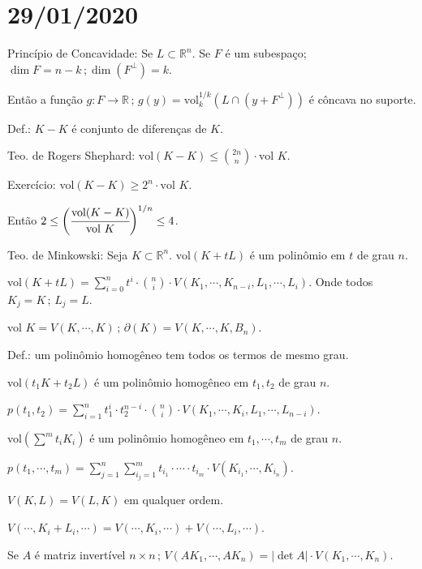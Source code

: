 \documentclass[12pt]{article}
\begin{document}
\vspace{100mm}

\section{29/01/2020}

\begin{flushright}
\end{flushright}

Princ\'ipio de Concavidade: Se $L \subset \mathbb{R}^n$. Se $F$ \'e um subespa\c{c}o; $\dim F = n - k\,;\dim (F^\perp) = k$.

Ent\~ao a fun\c{c}\~ao $g: F \to \mathbb{R}\,;\,g(y) = \text{vol}_k^{1/k} (L \cap (y + F^\perp))$ \'e c\^oncava no suporte.

Def.: $K - K$ \'e conjunto de diferen\c{c}as de $K$.

Teo. de Rogers Shephard: $\text{vol}(K - K) \le \binom{2n}{n} \cdot \text{vol }K$.

Exerc\'icio: vol$(K - K) \ge 2^n\cdot \text{vol }K$.

Ent\~ao $2 \le \bigg( \cfrac{\text{vol}(K - K)}{\text{vol }K} \bigg)^{1/n} \le 4$.

Teo. de Minkowski: Seja $K \subset \mathbb{R}^n$. $\text{vol}(K + tL)$ \'e um polin\^omio em $t$ de grau $n$.

vol$(K + tL) = \sum_{i = 0}^n t^i\cdot\binom{n}{i}\cdot V(K_1, \cdots, K_{n-i}, L_1, \cdots, L_i)$. Onde todos $K_j = K\,;\,L_j = L$.

vol $K = V(K, \cdots, K)\,;\,\partial(K) = V(K, \cdots, K, B_n)$.

Def.: um polin\^omio homog\^eneo tem todos os termos de mesmo grau.

vol$(t_1 K + t_2 L)$ \'e um polin\^omio homog\^eneo em $t_1, t_2$ de grau $n$.

$p(t_1, t_2) = \sum_{i = 1}^n t_1^i \cdot t_2^{n - i}\cdot \binom{n}{i} \cdot V(K_1, \cdots, K_i, L_1, \cdots, L_{n - i})$.

vol$(\sum^m t_i K_i)$ \'e um polin\^omio homog\^eneo em $t_1, \cdots, t_m$ de grau $n$.

$p(t_1, \cdots, t_m) = \sum_{j = 1}^n \sum_{i_j = 1}^m t_{i_1}\cdot \cdots \cdot t_{i_m}\cdot V(K_{i_1}, \cdots, K_{i_n})$.

$V(K,L) = V(L,K)$ em qualquer ordem.

$V(\cdots, K_i + L_i, \cdots) = V(\cdots, K_i, \cdots) + V(\cdots, L_i, \cdots)$.

Se $A$ \'e matriz invert\'ivel $n \times n\,;\,V(AK_1, \cdots, AK_n) = |\det A| \cdot V(K_1, \cdots, K_n)$.
\end{document}
